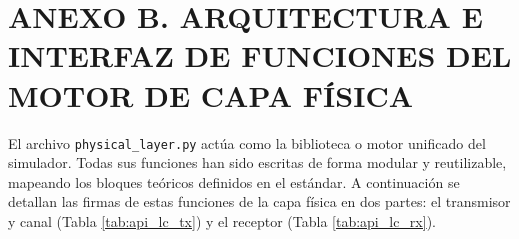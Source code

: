 \clearpage

\section*{ANEXO B. ARQUITECTURA E INTERFAZ DE FUNCIONES DEL MOTOR DE CAPA FÍSICA}
\label{anexo:estructura_funciones_simulador}

El archivo \texttt{physical\_layer.py} actúa como la biblioteca o motor unificado del simulador. Todas sus funciones han sido escritas de forma modular y reutilizable, mapeando los bloques teóricos definidos en el estándar. A continuación se detallan las firmas de estas funciones de la capa física en dos partes: el transmisor y canal (Tabla \ref{tab:api_lc_tx}) y el receptor (Tabla \ref{tab:api_lc_rx}).

\renewcommand{\thetable}{B.\arabic{table}}
\setcounter{table}{0}

